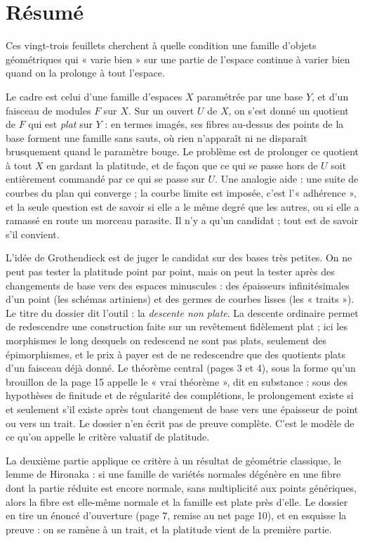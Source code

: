 \documentclass[11pt,a4paper]{article}
\begin{document}
\section*{Résumé}

\begin{resume}
Ces vingt-trois feuillets cherchent à quelle condition une famille d'objets
géométriques qui « varie bien » sur une partie de l'espace continue à varier
bien quand on la prolonge à tout l'espace.

Le cadre est celui d'une famille d'espaces $X$ paramétrée par une base $Y$,
et d'un faisceau de modules $F$ sur $X$. Sur un ouvert $U$ de $X$, on s'est
donné un quotient de $F$ qui est \emph{plat} sur $Y$ : en termes imagés, ses
fibres au-dessus des points de la base forment une famille sans sauts, où rien
n'apparaît ni ne disparaît brusquement quand le paramètre bouge. Le
problème est de prolonger ce quotient à tout $X$ en gardant la platitude, et
de façon que ce qui se passe hors de $U$ soit entièrement commandé par ce qui
se passe sur $U$. Une analogie aide : une suite de courbes du plan qui
converge ; la courbe limite est imposée, c'est l'« adhérence », et la seule
question est de savoir si elle a le même degré que les autres, ou si elle a
ramassé en route un morceau parasite. Il n'y a qu'un candidat ; tout est de
savoir s'il convient.

L'idée de Grothendieck est de juger le candidat sur des bases très petites.
On ne peut pas tester la platitude point par point, mais on peut la tester
après des changements de base vers des espaces minuscules : des épaisseurs
infinitésimales d'un point (les schémas artiniens) et des germes de courbes
lisses (les « traits »). Le titre du dossier dit l'outil : la \emph{descente
non plate}. La descente ordinaire permet de redescendre une construction faite
sur un revêtement fidèlement plat ; ici les morphismes le long desquels on
redescend ne sont pas plats, seulement des épimorphismes, et le prix à payer
est de ne redescendre que des quotients plats d'un faisceau déjà donné. Le
théorème central (pages 3 et 4), sous la forme qu'un brouillon de la page 15
appelle le « vrai théorème », dit en substance : sous des hypothèses de
finitude et de régularité des complétions, le prolongement existe si et
seulement s'il existe après tout changement de base vers une épaisseur de
point ou vers un trait. Le dossier n'en écrit pas de preuve complète. C'est le modèle de ce qu'on appelle le critère
valuatif de platitude.

La deuxième partie applique ce critère à un résultat de géométrie classique,
le lemme de Hironaka : si une famille de variétés normales dégénère en une
fibre dont la partie réduite est encore normale, sans multiplicité aux points
génériques, alors la fibre est elle-même normale et la famille est plate près
d'elle. Le dossier en tire un énoncé d'ouverture (page 7, remise au net
page 10), et en esquisse la preuve : on se ramène à un trait, et la platitude
vient de la première partie.


\end{resume}
\end{document}
